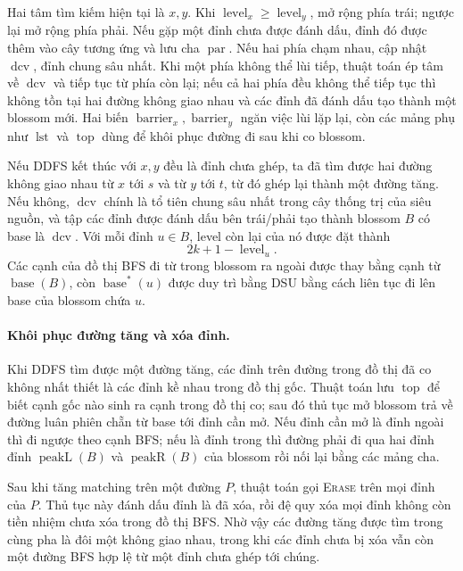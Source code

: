 \documentclass[11pt]{article}
\begin{document}
Hai tâm tìm kiếm hiện tại là \(x,y\). Khi \(\operatorname{level}_x\ge
\operatorname{level}_y\), mở rộng phía trái; ngược lại mở rộng phía phải. Nếu
gặp một đỉnh chưa được đánh dấu, đỉnh đó được thêm vào cây tương ứng và lưu
cha \(\operatorname{par}\). Nếu hai phía chạm nhau, cập nhật
\(\operatorname{dcv}\), đỉnh chung sâu nhất. Khi một phía không thể lùi tiếp,
thuật toán ép tâm về \(\operatorname{dcv}\) và tiếp tục từ phía còn lại; nếu
cả hai phía đều không thể tiếp tục thì không tồn tại hai đường không giao nhau
và các đỉnh đã đánh dấu tạo thành một blossom mới. Hai biến
\(\operatorname{barrier}_x,\operatorname{barrier}_y\) ngăn việc lùi lặp lại,
còn các mảng phụ như \(\operatorname{lst}\) và \(\operatorname{top}\) dùng để
khôi phục đường đi sau khi co blossom.


Nếu DDFS kết thúc với \(x,y\) đều là đỉnh chưa ghép, ta đã tìm được hai đường
không giao nhau từ \(x\) tới \(s\) và từ \(y\) tới \(t\), từ đó ghép lại thành
một đường tăng. Nếu không, \(\operatorname{dcv}\) chính là tổ tiên chung sâu
nhất trong cây thống trị của siêu nguồn, và tập các đỉnh được đánh dấu bên
trái/phải tạo thành blossom \(B\) có base là \(\operatorname{dcv}\). Với mỗi
đỉnh \(u\in B\), level còn lại của nó được đặt thành
\[
  2k+1-\operatorname{level}_u.
\]
Các cạnh của đồ thị BFS đi từ trong blossom ra ngoài được thay bằng cạnh từ
\(\operatorname{base}(B)\), còn \(\operatorname{base}^*(u)\) được duy trì bằng
DSU bằng cách liên tục đi lên base của blossom chứa \(u\).

\paragraph{Khôi phục đường tăng và xóa đỉnh.}
Khi DDFS tìm được một đường tăng, các đỉnh trên đường trong đồ thị đã co không
nhất thiết là các đỉnh kề nhau trong đồ thị gốc. Thuật toán lưu
\(\operatorname{top}\) để biết cạnh gốc nào sinh ra cạnh trong đồ thị co; sau
đó thủ tục mở blossom trả về đường luân phiên chẵn từ base tới đỉnh cần mở.
Nếu đỉnh cần mở là đỉnh ngoài thì đi ngược theo cạnh BFS; nếu là đỉnh trong
thì đường phải đi qua hai đỉnh đỉnh \(\operatorname{peakL}(B)\) và
\(\operatorname{peakR}(B)\) của blossom rồi nối lại bằng các mảng cha.

Sau khi tăng matching trên một đường \(P\), thuật toán gọi \textsc{Erase} trên
mọi đỉnh của \(P\). Thủ tục này đánh dấu đỉnh là đã xóa, rồi đệ quy xóa mọi
đỉnh không còn tiền nhiệm chưa xóa trong đồ thị BFS. Nhờ vậy các đường tăng
được tìm trong cùng pha là đôi một không giao nhau, trong khi các đỉnh chưa bị
xóa vẫn còn một đường BFS hợp lệ từ một đỉnh chưa ghép tới chúng.
\end{document}
